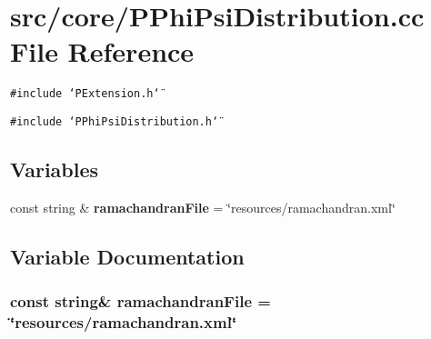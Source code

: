 \section{src/core/PPhi\-Psi\-Distribution.cc File Reference}
\label{PPhiPsiDistribution_8cc}


{\tt \#include \char`\"{}PExtension.h\char`\"{}}\par
{\tt \#include \char`\"{}PPhi\-Psi\-Distribution.h\char`\"{}}\par
\subsection*{Variables}
\begin{CompactItemize}
\item 
const string \& {\bf ramachandran\-File} = \char`\"{}resources/ramachandran.xml\char`\"{}
\end{CompactItemize}


\subsection{Variable Documentation}
\subsubsection{\setlength{\rightskip}{0pt plus 5cm}const string\& {\bf ramachandran\-File} = \char`\"{}resources/ramachandran.xml\char`\"{}}\label{PPhiPsiDistribution_8cc_49f27cf68923b21aae3a3fe71a0b187f}


